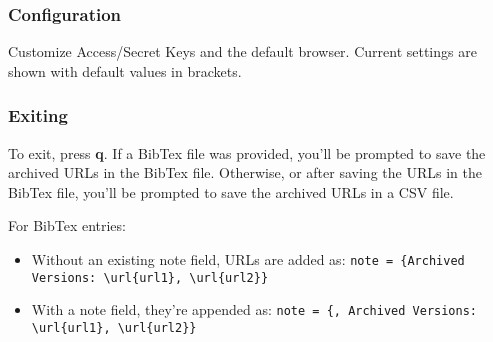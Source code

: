 \subsubsection{Configuration}

Customize Access/Secret Keys and the default browser. Current settings are shown with default values in brackets.

\subsubsection{Exiting}

To exit, press \textbf{q}. If a BibTex file was provided, you'll be prompted to save the archived URLs in the BibTex file. Otherwise, or after saving the URLs in the BibTex file, you'll be prompted to save the archived URLs in a CSV file.

For BibTex entries:
\begin{itemize}
	\item Without an existing note field, URLs are added as: \texttt{note = \{Archived Versions: \textbackslash url\{url1\}, \textbackslash url\{url2\}\}}
	\item With a note field, they're appended as: \texttt{note = \{<current note>, Archived Versions: \textbackslash url\{url1\}, \textbackslash url\{url2\}\}}
\end{itemize}
